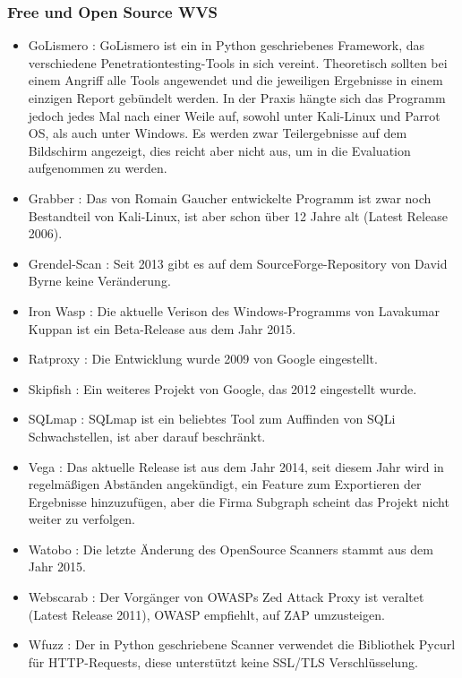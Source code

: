 \documentclass[12pt,oneside,a4paper,parskip,pointlessnumbers]{scrbook}
\begin{document}
    \subsubsection{Free und Open Source WVS}
    \begin{itemize}
      \item GoLismero \cite{GoLismero}: GoLismero ist ein in Python geschriebenes Framework, das verschiedene Penetrationtesting-Tools in sich vereint. Theoretisch sollten bei einem Angriff alle Tools angewendet und die jeweiligen Ergebnisse in einem einzigen Report gebündelt werden. In der Praxis hängte sich das Programm jedoch jedes Mal nach einer Weile auf, sowohl unter Kali-Linux und Parrot OS, als auch unter Windows. Es werden zwar Teilergebnisse auf dem Bildschirm angezeigt, dies reicht aber nicht aus, um in die Evaluation aufgenommen zu werden.
      \item Grabber \cite{Grabber}: Das von Romain Gaucher entwickelte Programm ist zwar noch Bestandteil von Kali-Linux, ist aber schon über 12 Jahre alt (Latest Release 2006).
      \item Grendel-Scan \cite{Grendel}: Seit 2013 gibt es auf dem SourceForge-Repository von David Byrne keine Veränderung.
      \item Iron Wasp \cite{Iron}: Die aktuelle Verison des Windows-Programms von Lavakumar Kuppan ist ein Beta-Release aus dem Jahr 2015.
      \item Ratproxy \cite{Ratproxy}: Die Entwicklung wurde 2009 von Google eingestellt.
      \item Skipfish \cite{Skipfish}: Ein weiteres Projekt von Google, das 2012 eingestellt wurde.
      \item SQLmap \cite{SQLmap}: SQLmap ist ein beliebtes Tool zum Auffinden von SQLi Schwachstellen, ist aber darauf beschränkt.
      \item Vega \cite{Vega}: Das aktuelle Release ist aus dem Jahr 2014, seit diesem Jahr wird in regelmäßigen Abständen angekündigt, ein Feature zum Exportieren der Ergebnisse hinzuzufügen, aber die Firma Subgraph scheint das Projekt nicht weiter zu verfolgen.
      \item Watobo \cite{Watobo}: Die letzte Änderung des OpenSource Scanners stammt aus dem Jahr 2015.
      \item Webscarab \cite{Webscarab}: Der Vorgänger von OWASPs Zed Attack Proxy ist veraltet (Latest Release 2011), OWASP empfiehlt, auf ZAP umzusteigen.
      \item Wfuzz \cite{Wfuzz}: Der in Python geschriebene Scanner verwendet die Bibliothek Pycurl für HTTP-Requests, diese unterstützt keine SSL/TLS Verschlüsselung.

\end{itemize}
\end{document}
